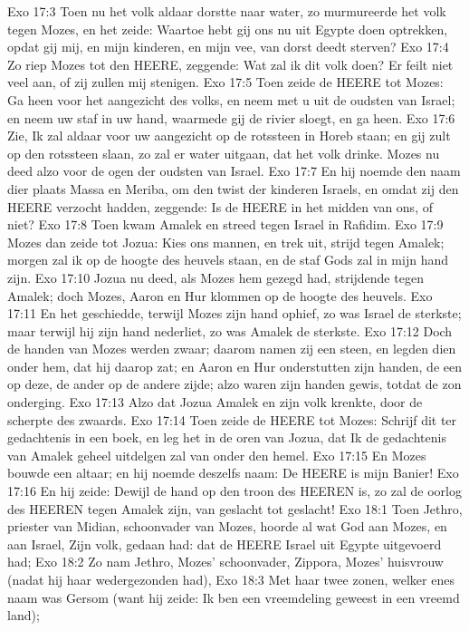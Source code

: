 Exo 17:3  Toen nu het volk aldaar dorstte naar water, zo murmureerde het volk tegen Mozes, en het zeide: Waartoe hebt gij ons nu uit Egypte doen optrekken, opdat gij mij, en mijn kinderen, en mijn vee, van dorst deedt sterven?
Exo 17:4  Zo riep Mozes tot den HEERE, zeggende: Wat zal ik dit volk doen? Er feilt niet veel aan, of zij zullen mij stenigen.
Exo 17:5  Toen zeide de HEERE tot Mozes: Ga heen voor het aangezicht des volks, en neem met u uit de oudsten van Israel; en neem uw staf in uw hand, waarmede gij de rivier sloegt, en ga heen.
Exo 17:6  Zie, Ik zal aldaar voor uw aangezicht op de rotssteen in Horeb staan; en gij zult op den rotssteen slaan, zo zal er water uitgaan, dat het volk drinke. Mozes nu deed alzo voor de ogen der oudsten van Israel.
Exo 17:7  En hij noemde den naam dier plaats Massa en Meriba, om den twist der kinderen Israels, en omdat zij den HEERE verzocht hadden, zeggende: Is de HEERE in het midden van ons, of niet?
Exo 17:8  Toen kwam Amalek en streed tegen Israel in Rafidim.
Exo 17:9  Mozes dan zeide tot Jozua: Kies ons mannen, en trek uit, strijd tegen Amalek; morgen zal ik op de hoogte des heuvels staan, en de staf Gods zal in mijn hand zijn.
Exo 17:10  Jozua nu deed, als Mozes hem gezegd had, strijdende tegen Amalek; doch Mozes, Aaron en Hur klommen op de hoogte des heuvels.
Exo 17:11  En het geschiedde, terwijl Mozes zijn hand ophief, zo was Israel de sterkste; maar terwijl hij zijn hand nederliet, zo was Amalek de sterkste.
Exo 17:12  Doch de handen van Mozes werden zwaar; daarom namen zij een steen, en legden dien onder hem, dat hij daarop zat; en Aaron en Hur onderstutten zijn handen, de een op deze, de ander op de andere zijde; alzo waren zijn handen gewis, totdat de zon onderging.
Exo 17:13  Alzo dat Jozua Amalek en zijn volk krenkte, door de scherpte des zwaards.
Exo 17:14  Toen zeide de HEERE tot Mozes: Schrijf dit ter gedachtenis in een boek, en leg het in de oren van Jozua, dat Ik de gedachtenis van Amalek geheel uitdelgen zal van onder den hemel.
Exo 17:15  En Mozes bouwde een altaar; en hij noemde deszelfs naam: De HEERE is mijn Banier!
Exo 17:16  En hij zeide: Dewijl de hand op den troon des HEEREN is, zo zal de oorlog des HEEREN tegen Amalek zijn, van geslacht tot geslacht!
Exo 18:1  Toen Jethro, priester van Midian, schoonvader van Mozes, hoorde al wat God aan Mozes, en aan Israel, Zijn volk, gedaan had: dat de HEERE Israel uit Egypte uitgevoerd had;
Exo 18:2  Zo nam Jethro, Mozes' schoonvader, Zippora, Mozes' huisvrouw (nadat hij haar wedergezonden had),
Exo 18:3  Met haar twee zonen, welker enes naam was Gersom (want hij zeide: Ik ben een vreemdeling geweest in een vreemd land);
